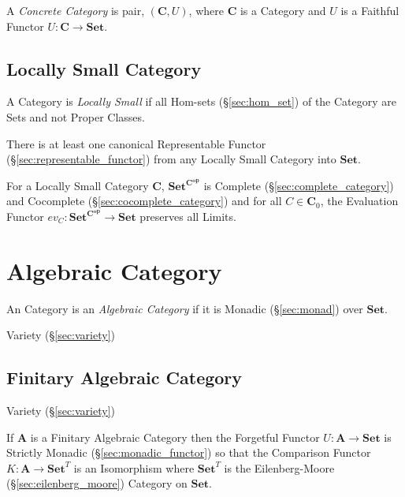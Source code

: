 A \emph{Concrete Category} is pair, $(\mathbf{C},U)$, where
$\mathbf{C}$ is a Category and $U$ is a Faithful Functor $U :
\mathbf{C} \rightarrow \mathbf{Set}$.



\subsection{Locally Small Category}\label{sec:locally_small}

A Category is \emph{Locally Small} if all Hom-sets
(\S\ref{sec:hom_set}) of the Category are Sets and not Proper Classes.

There is at least one canonical Representable Functor
(\S\ref{sec:representable_functor}) from any Locally Small Category
into $\mathbf{Set}$.

For a Locally Small Category $\mathbf{C}$, $\mathbf{Set^{C^{op}}}$ is
Complete (\S\ref{sec:complete_category}) and Cocomplete
(\S\ref{sec:cocomplete_category}) and for all $C \in \mathbf{C}_0$,
the Evaluation Functor $ev_C : \mathbf{Set^{C^{op}}} \rightarrow
\mathbf{Set}$ preserves all Limits. \cite{awodey06}



\section{Algebraic Category}\label{sec:algebraic_category}

An Category is an \emph{Algebraic Category} if it is Monadic
(\S\ref{sec:monad}) over $\mathbf{Set}$.

Variety (\S\ref{sec:variety})



\subsection{Finitary Algebraic Category}
\label{sec:finitary_algebraic_category}

Variety (\S\ref{sec:variety})

If $\mathbf{A}$ is a Finitary Algebraic Category then the Forgetful
Functor $U : \mathbf{A} \rightarrow \mathbf{Set}$ is Strictly Monadic
(\S\ref{sec:monadic_functor}) so that the Comparison Functor $K :
\mathbf{A} \rightarrow \mathbf{Set}^T$ is an Isomorphism where
$\mathbf{Set}^T$ is the Eilenberg-Moore (\S\ref{sec:eilenberg_moore})
Category on $\mathbf{Set}$.

